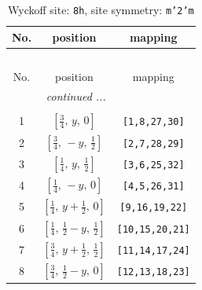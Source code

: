 \documentclass[fleqn,8pt]{jsarticle}
\begin{document}
\begin{longtable}{ccc}
\caption{Wyckoff site: {\tt 8h}, site symmetry: {\tt m'2'm}}
 \\
 \hline \hline
No. & position & mapping \\ \hline \endfirsthead

\multicolumn{2}{l}{\tablename\ \thetable{}} \\
 \hline \hline
No. & position & mapping \\ \hline \endhead

 \hline \hline
\multicolumn{2}{r}{\footnotesize\it continued ...} \\ \endfoot

 \hline \hline
\multicolumn{2}{r}{} \\ \endlastfoot

1 & $\left[ \frac{3}{4},\, y,\, 0 \right]$ & {\tt [1,8,27,30]} \\ \hline
2 & $\left[ \frac{3}{4},\, - y,\, \frac{1}{2} \right]$ & {\tt [2,7,28,29]} \\ \hline
3 & $\left[ \frac{1}{4},\, y,\, \frac{1}{2} \right]$ & {\tt [3,6,25,32]} \\ \hline
4 & $\left[ \frac{1}{4},\, - y,\, 0 \right]$ & {\tt [4,5,26,31]} \\ \hline
5 & $\left[ \frac{1}{4},\, y + \frac{1}{2},\, 0 \right]$ & {\tt [9,16,19,22]} \\ \hline
6 & $\left[ \frac{1}{4},\, \frac{1}{2} - y,\, \frac{1}{2} \right]$ & {\tt [10,15,20,21]} \\ \hline
7 & $\left[ \frac{3}{4},\, y + \frac{1}{2},\, \frac{1}{2} \right]$ & {\tt [11,14,17,24]} \\ \hline
8 & $\left[ \frac{3}{4},\, \frac{1}{2} - y,\, 0 \right]$ & {\tt [12,13,18,23]} \\
\end{longtable}
\renewcommand{\arraystretch}{1.2}
\end{document}
